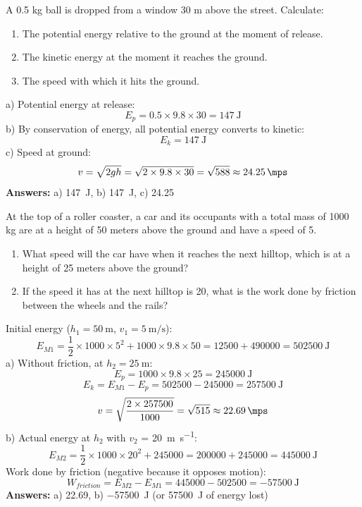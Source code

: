 \begin{exercise}
    A 0.5 kg ball is dropped from a window 30 m above the street. Calculate:
    \begin{enumerate}[label=\alph*)]
\item The potential energy relative to the ground at the moment of release.
\item The kinetic energy at the moment it reaches the ground.
\item The speed with which it hits the ground.
    \end{enumerate}
    \begin{solu}
        a) Potential energy at release:
        \[
            E_p = 0.5 \times 9.8 \times 30 = \qty{147}{\joule}
        \]
        b) By conservation of energy, all potential energy converts to kinetic:
        \[
            E_k = \qty{147}{\joule}
        \]
        c) Speed at ground:
        \[
            v = \sqrt{2gh} = \sqrt{2 \times 9.8 \times 30} = \sqrt{588} \approx \qty{24.25}{\mps}
        \]
        \textbf{Answers:} a) \qty{147}{\joule}, b) \qty{147}{\joule}, c) \qty{24.25}{\mps}
    \end{solu}
\end{exercise}

\begin{exercise}
    At the top of a roller coaster, a car and its occupants with a total mass of 1000 kg are at a height of 50 meters above the ground and have a speed of \qty{5}{\mps}.
    \begin{enumerate}[label=\alph*)]
\item What speed will the car have when it reaches the next hilltop, which is at a height of 25 meters above the ground?
\item If the speed it has at the next hilltop is \qty{20}{\mps}, what is the work done by friction between the wheels and the rails?
    \end{enumerate}
    \begin{solu}
        Initial energy (\( h_1 = \qty{50}{\metre} \), \( v_1 = \qty{5}{\metre\per\second} \)):
        \[
            E_{M1} = \frac{1}{2} \times 1000 \times 5^2 + 1000 \times 9.8 \times 50 = 12500 + 490000 = \qty{502500}{\joule}
        \]
        a) Without friction, at \( h_2 = \qty{25}{\metre} \):
        \[
            E_p = 1000 \times 9.8 \times 25 = \qty{245000}{\joule}
        \]
        \[
            E_k = E_{M1} - E_p = 502500 - 245000 = \qty{257500}{\joule}
        \]
        \[
            v = \sqrt{\frac{2 \times 257500}{1000}} = \sqrt{515} \approx \qty{22.69}{\mps}
        \]
        b) Actual energy at \( h_2 \) with \( v_2 \) = \qty{20}{\metre\per\second}:
        \[
            E_{M2} = \frac{1}{2} \times 1000 \times 20^2 + 245000 = 200000 + 245000 = \qty{445000}{\joule}
        \]
        Work done by friction (negative because it opposes motion):
        \[
            W_{friction} = E_{M2} - E_{M1} = 445000 - 502500 = \qty{-57500}{\joule}
        \]
        \textbf{Answers:} a) \qty{22.69}{\mps}, b) \qty{-57500}{\joule} (or \qty{57500}{\joule} of energy lost)
    \end{solu}
\end{exercise}

